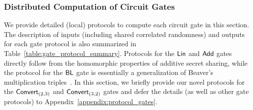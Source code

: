 \subsubsection{Distributed Computation of Circuit Gates}
We provide detailed (local) protocols to compute each circuit gate in this section. The description of inputs (including shared correlated randomness) and outputs for each gate protocol is also summarized in Table~\ref{table:gate_protocol_summary}. 
\iffull\else Protocols for the $\textnormal{\textsf{Lin}}$ and $\textnormal{\textsf{Add}}$ gates directly follow from the homomorphic properties of additive secret sharing, while the protocol for the $\textnormal{\textsf{BL}}$ gate is essentially a generalization of Beaver's multiplication triples~\cite{boyle2019-fss-preprocess,beaver1991-triples}. In this section, we briefly provide our novel protocols for the $\textnormal{\textsf{Convert}}_{(2,3)}$ and $\textnormal{\textsf{Convert}}_{(3,2)}$ gates and defer the details (as well as other gate protocols) to Appendix~\ref{appendix:protocol_gates}.
\fi
\begin{table}[t!]
\caption{Summary of input, output, and randomness for circuit gate protocols.
}
\label{table:gate_protocol_summary}
\end{table}

